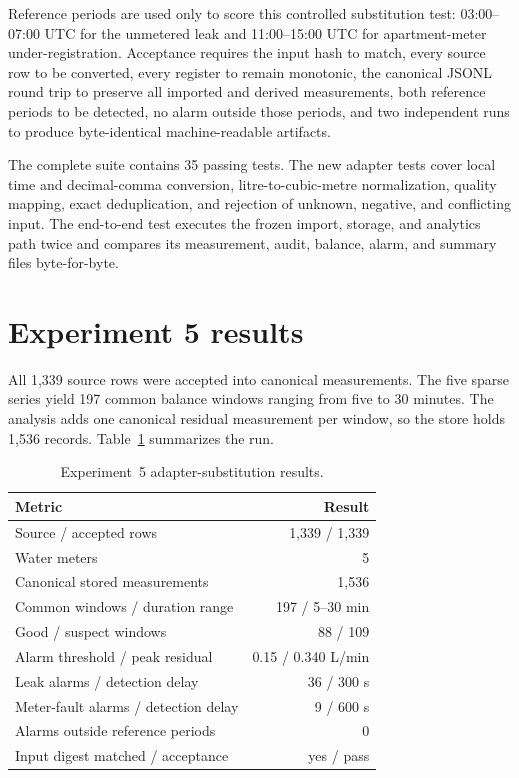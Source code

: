 \documentclass[11pt,a4paper]{article}
\begin{document}
Reference periods are used only to score this controlled substitution test:
03:00--07:00 UTC for the unmetered leak and 11:00--15:00 UTC for apartment-meter
under-registration. Acceptance requires the input hash to match, every source
row to be converted, every register to remain monotonic, the canonical JSONL
round trip to preserve all imported and derived measurements, both reference
periods to be detected, no alarm outside those periods, and two independent
runs to produce byte-identical machine-readable artifacts.

The complete suite contains 35 passing tests. The new adapter tests cover local
time and decimal-comma conversion, litre-to-cubic-metre normalization, quality
mapping, exact deduplication, and rejection of unknown, negative, and conflicting
input. The end-to-end test executes the frozen import, storage, and analytics
path twice and compares its measurement, audit, balance, alarm, and summary
files byte-for-byte.

\section{Experiment 5 results}
All 1,339 source rows were accepted into canonical measurements. The five sparse
series yield 197 common balance windows ranging from five to 30 minutes. The
analysis adds one canonical residual measurement per window, so the store holds
1,536 records. Table~\ref{tab:experiment5-results} summarizes the run.

\begin{table}[htbp]
  \centering
  \caption{Experiment~5 adapter-substitution results.}
  \label{tab:experiment5-results}
  \begin{tabular}{lr}
    \toprule
    Metric & Result \\
    \midrule
    Source / accepted rows & 1,339 / 1,339 \\
    Water meters & 5 \\
    Canonical stored measurements & 1,536 \\
    Common windows / duration range & 197 / 5--30 min \\
    Good / suspect windows & 88 / 109 \\
    Alarm threshold / peak residual & 0.15 / 0.340 L/min \\
    Leak alarms / detection delay & 36 / 300 s \\
    Meter-fault alarms / detection delay & 9 / 600 s \\
    Alarms outside reference periods & 0 \\
    Input digest matched / acceptance & yes / pass \\
    \bottomrule
  \end{tabular}
\end{table}
\end{document}
